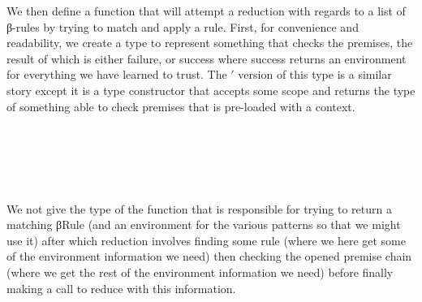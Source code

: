 We then define a function that will attempt a reduction with regards
to a list of β-rules by trying to match and apply a rule. First, for
convenience and readability, we create a type to represent something
that checks the premises, the result of which is either failure, or
success where success returns an environment for everything we have
learned to trust. The $'$ version of this type is a similar story
except it is a type constructor that accepts some scope and returns
the type of something able to check premises that is pre-loaded with
a context.
\begin{code}%
\>[0]\AgdaSpace{}%
\AgdaSymbol{=}%
\>[16]\AgdaSymbol{\}}\AgdaSpace{}%
\AgdaSpace{}%
\AgdaSpace{}%
%
\>[41]\<%
\\
%
\>[16]\AgdaSymbol{\{}\AgdaSpace{}%
\AgdaSpace{}%
\AgdaSpace{}%
\AgdaSymbol{:}\AgdaSpace{}%
\AgdaSpace{}%
\AgdaSymbol{\}}%
\>[41]\<%
\\
%
\>[16]\AgdaSpace{}%
\AgdaSpace{}%
\AgdaSpace{}%
\AgdaSpace{}%
%
\>[41]\<%
\\
%
\>[16]\AgdaSpace{}%
\AgdaSpace{}%
\AgdaSpace{}%
%
\>[41]\<%
\\
%
\>[16]\AgdaSpace{}%
\AgdaSymbol{(}\AgdaSpace{}%
\AgdaSymbol{)}\<%
\end{code}
We not give the type of the function that is responsible for trying to
return a matching βRule (and an environment for the various patterns so
that we might use it) after which reduction involves finding some rule (where
we here get some of the environment information we need) then checking the
opened premise chain (where we get the rest of the environment information
we need) before finally making a call to reduce with this information.
